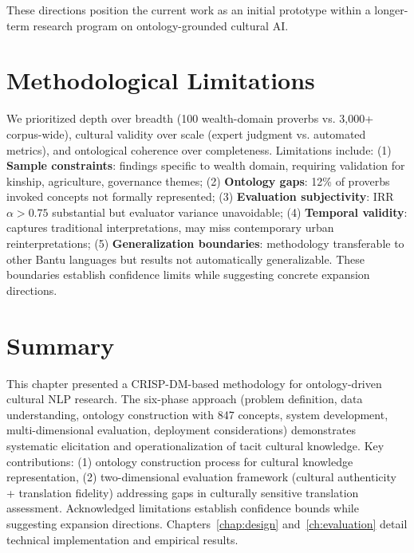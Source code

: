 These directions position the current work as an initial prototype within a longer-term research program on ontology-grounded cultural AI.

\section{Methodological Limitations}
\label{sec:methodological_limitations}

We prioritized depth over breadth (100 wealth-domain proverbs vs. 3,000+ corpus-wide), cultural validity over scale (expert judgment vs. automated metrics), and ontological coherence over completeness. Limitations include: (1) \textbf{Sample constraints}: findings specific to wealth domain, requiring validation for kinship, agriculture, governance themes; (2) \textbf{Ontology gaps}: 12\% of proverbs invoked concepts not formally represented; (3) \textbf{Evaluation subjectivity}: IRR $\alpha > 0.75$ substantial but evaluator variance unavoidable; (4) \textbf{Temporal validity}: captures traditional interpretations, may miss contemporary urban reinterpretations; (5) \textbf{Generalization boundaries}: methodology transferable to other Bantu languages but results not automatically generalizable. These boundaries establish confidence limits while suggesting concrete expansion directions.

\section{Summary}
\label{sec:methodology_summary}

This chapter presented a CRISP-DM-based methodology for ontology-driven cultural NLP research. The six-phase approach (problem definition, data understanding, ontology construction with 847 concepts, system development, multi-dimensional evaluation, deployment considerations) demonstrates systematic elicitation and operationalization of tacit cultural knowledge. Key contributions: (1) ontology construction process for cultural knowledge representation, (2) two-dimensional evaluation framework (cultural authenticity + translation fidelity) addressing gaps in culturally sensitive translation assessment. Acknowledged limitations establish confidence bounds while suggesting expansion directions. Chapters~\ref{chap:design} and~\ref{ch:evaluation} detail technical implementation and empirical results.
